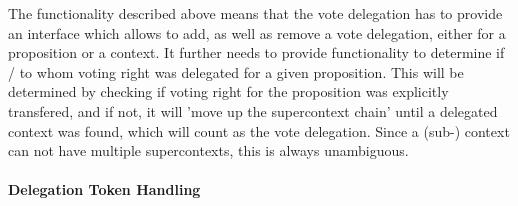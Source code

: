 The functionality described above means that the vote delegation has to provide an interface which allows to add, as well as remove a vote delegation, either for a proposition or a context. It further needs to provide functionality to determine if / to whom voting right was delegated for a given proposition. This will be determined by checking if voting right for the proposition was explicitly transfered, and if not, it will 'move up the supercontext chain' until a delegated context was found, which will count as the vote delegation. Since a (sub-) context  can not have multiple supercontexts, this is always unambiguous.

\paragraph*{Delegation Token Handling} \mbox{} \\


